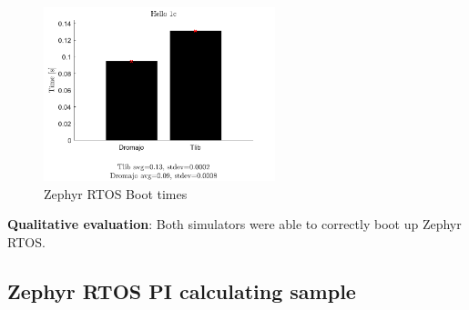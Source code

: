 \begin{figure}[h]
	\centering
	\includegraphics[width=0.6\textwidth]{figures/benchmarks/Hello1c.pdf}
	\caption{Zephyr RTOS Boot times}
\end{figure}
\noindent
\textbf{Qualitative evaluation}: Both simulators were able to correctly boot up Zephyr RTOS.
\vspace*{15px}

\subsection{Zephyr RTOS PI calculating sample}

